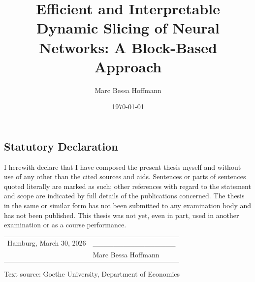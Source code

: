 \documentclass[
12pt,
fancyheadings,
a4paper,
twoside,
BCOR=0.7cm,
nobcorignoretitle,
grayscalebody,
]{stsreprt}
\author{Marc Bessa Hoffmann}
\title{Efficient and Interpretable Dynamic Slicing of Neural Networks: A Block-Based Approach}
\date{\today}
\begin{document}
\frontmatter
\maketitle

\newpage\null\thispagestyle{empty}\newpage

\begin{center}
\section*{Statutory Declaration}
\end{center}

\vspace{1cm}

\noindent I herewith declare that I have composed the present thesis myself and without use of any other than the
cited sources and aids. Sentences or parts of sentences quoted literally are marked as such; other
references
with regard to the statement and scope are indicated by full details of the publications concerned.
The thesis
in the same or similar form has not been submitted to any examination body and has not been
published.
This thesis was not yet, even in part, used in another examination or as a course performance.

\vspace{2cm}

\noindent
\begin{tabular}{@{}p{}p{}@{}}
Hamburg, March 30, 2026 &  \_\_\_\_\_\_\_\_\_\_\_\_\_\_\_\_ \\
& Marc Bessa Hoffmann
\end{tabular}

\vfill

\begin{center}
\footnotesize Text source: Goethe University, Department of Economics
\end{center}
\end{document}
